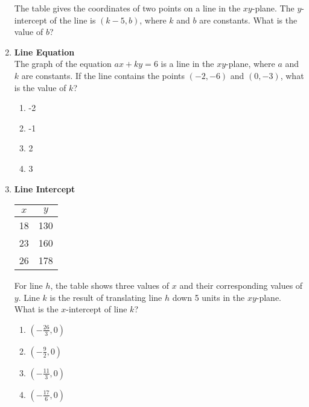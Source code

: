 \begin{enumerate}
The table gives the coordinates of two points on a line in the $xy$-plane. The $y$-intercept of the line is $(k-5, b)$, where $k$ and $b$ are constants. What is the value of $b$?
\begin{subanswer}
\end{subanswer}

\item \textbf{Line Equation}\\
The graph of the equation $ax + ky = 6$ is a line in the $xy$-plane, where $a$ and $k$ are constants. If the line contains the points $(-2, -6)$ and $(0, -3)$, what is the value of $k$?
\begin{enumerate}[label=(\Alph*)]
  \item -2
  \item -1
  \item 2
  \item 3
\end{enumerate}
\begin{subanswer}
\end{subanswer}

\item \textbf{Line Intercept}\\
\begin{center}
\begin{tabular}{|c|c|}
\hline
$x$ & $y$ \\
\hline
18 & 130 \\
\hline
23 & 160 \\
\hline
26 & 178 \\
\hline
\end{tabular}
\end{center}

For line $h$, the table shows three values of $x$ and their corresponding values of $y$. Line $k$ is the result of translating line $h$ down 5 units in the $xy$-plane. What is the $x$-intercept of line $k$?
\begin{enumerate}[label=(\Alph*)]
  \item $\left(-\frac{26}{3}, 0\right)$
  \item $\left(-\frac{9}{2}, 0\right)$
  \item $\left(-\frac{11}{3}, 0\right)$
  \item $\left(-\frac{17}{6}, 0\right)$
\end{enumerate}
\begin{subanswer}
\end{subanswer}


\end{enumerate}

